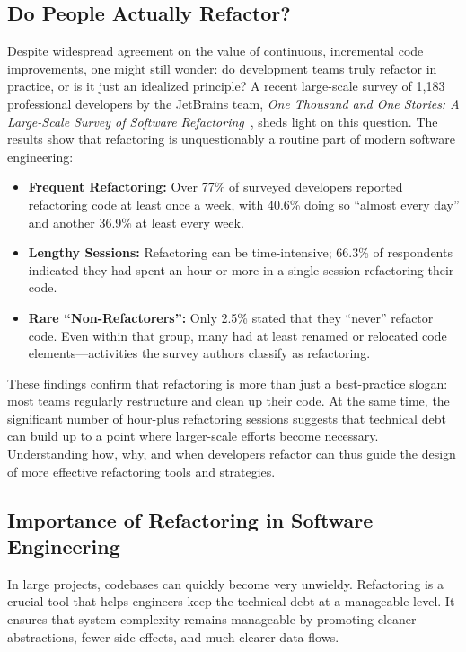 \subsection{Do People Actually Refactor?}
\label{sec:do-people-refactor}

Despite widespread agreement on the value of continuous, incremental code
improvements, one might still wonder: do development teams truly refactor in
practice, or is it just an idealized principle? A recent large-scale survey of
1,183 professional developers by the JetBrains team, \textit{One Thousand and
One Stories: A Large-Scale Survey of Software Refactoring}~\cite{jetbrains},
sheds light on this question. The results show that refactoring is
unquestionably a routine part of modern software engineering:

\begin{itemize}
    \item \textbf{Frequent Refactoring:} Over 77\% of surveyed developers
    reported refactoring code at least once a week, with 40.6\% doing so “almost
    every day” and another 36.9\% at least every week.
    \item \textbf{Lengthy Sessions:} Refactoring can be time-intensive; 66.3\%
    of respondents indicated they had spent an hour or more in a single session
    refactoring their code.
    \item \textbf{Rare “Non-Refactorers”:} Only 2.5\% stated that they “never”
    refactor code. Even within that group, many had at least renamed or
    relocated code elements—activities the survey authors classify as
    refactoring.
\end{itemize}

These findings confirm that refactoring is more than just a best-practice
slogan: most teams regularly restructure and clean up their code. At the same
time, the significant number of hour-plus refactoring sessions suggests that
technical debt can build up to a point where larger-scale efforts become
necessary. Understanding how, why, and when developers refactor can thus guide
the design of more effective refactoring tools and strategies.

\subsection{Importance of Refactoring in Software Engineering}
\label{sec:importance-refactoring}

In large projects, codebases can quickly become very unwieldy. Refactoring is a
crucial tool that helps engineers keep the technical debt at a manageable level.
It ensures that system complexity remains manageable by promoting cleaner
abstractions, fewer side effects, and much clearer data flows.

